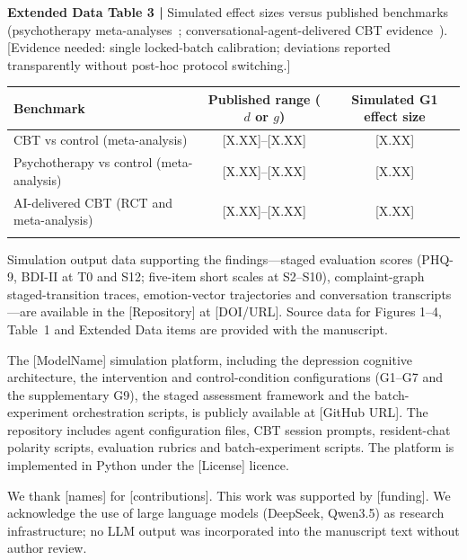 \documentclass[sn-nature,pdflatex]{sn-jnl}
\begin{document}
\begin{table}[h]
\parbox{0.9\textwidth}{\footnotesize\textbf{Extended Data Table 3 |} Simulated effect sizes versus published benchmarks (psychotherapy meta-analyses~\cite{cuijpers2013,hofmann2012,cuijpers2020}; conversational-agent-delivered CBT evidence~\cite{heinz2025,hang2026}). [Evidence needed: single locked-batch calibration; deviations reported transparently without post-hoc protocol switching.]}
\par\smallskip
\centering
\footnotesize
\begin{tabular}{@{}lcc@{}}
\toprule
Benchmark & Published range ($d$ or $g$) & Simulated G1 effect size \\
\midrule
CBT vs control (meta-analysis) & [X.XX]--[X.XX] & [X.XX] \\
Psychotherapy vs control (meta-analysis) & [X.XX]--[X.XX] & [X.XX] \\
AI-delivered CBT (RCT and meta-analysis) & [X.XX]--[X.XX] & [X.XX] \\
\botrule
\end{tabular}
\end{table}

\backmatter


Simulation output data supporting the findings---staged evaluation scores (PHQ-9, BDI-II at T0 and S12; five-item short scales at S2--S10), complaint-graph staged-transition traces, emotion-vector trajectories and conversation transcripts---are available in the [Repository] at [DOI/URL]. Source data for Figures 1--4, Table~1 and Extended Data items are provided with the manuscript.


The [ModelName] simulation platform, including the depression cognitive architecture, the intervention and control-condition configurations (G1--G7 and the supplementary G9), the staged assessment framework and the batch-experiment orchestration scripts, is publicly available at [GitHub URL]. The repository includes agent configuration files, CBT session prompts, resident-chat polarity scripts, evaluation rubrics and batch-experiment scripts. The platform is implemented in Python under the [License] licence.


We thank [names] for [contributions]. This work was supported by [funding]. We acknowledge the use of large language models (DeepSeek, Qwen3.5) as research infrastructure; no LLM output was incorporated into the manuscript text without author review.
\end{document}
